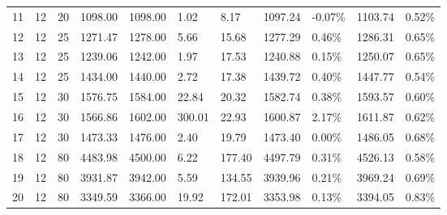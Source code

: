 \documentclass[../main]{subfiles}
\begin{document}
\begin{longtable}{l|ll|lll|lllll}
   11                  & 12                              & 20                     & 1098.00             & 1098.00  & 1.02          & 8.17                       & 1097.24                     & -0.07\% & 1103.74 & 0.52\% \\
   12                  & 12                              & 25                     & 1271.47             & 1278.00  & 5.66          & 15.68                      & \cellcolor{green!25}1277.29 & 0.46\%  & 1286.31 & 0.65\% \\
   13                  & 12                              & 25                     & 1239.06             & 1242.00  & 1.97          & 17.53                      & \cellcolor{green!25}1240.88 & 0.15\%  & 1250.07 & 0.65\% \\
   14                  & 12                              & 25                     & 1434.00             & 1440.00  & 2.72          & 17.38                      & \cellcolor{green!25}1439.72 & 0.40\%  & 1447.77 & 0.54\% \\
   15                  & 12                              & 30                     & 1576.75             & 1584.00  & 22.84         & \cellcolor{green!25}20.32  & \cellcolor{green!25}1582.74 & 0.38\%  & 1593.57 & 0.60\% \\
   16                  & 12                              & 30                     & 1566.86             & 1602.00  & 300.01        & \cellcolor{green!25}22.93  & \cellcolor{green!25}1600.87 & 2.17\%  & 1611.87 & 0.62\% \\
   17                  & 12                              & 30                     & 1473.33             & 1476.00  & 2.40          & 19.79                      & \cellcolor{green!25}1473.40 & 0.00\%  & 1486.05 & 0.68\% \\
   18                  & 12                              & 80                     & 4483.98             & 4500.00  & 6.22          & 177.40                     & \cellcolor{green!25}4497.79 & 0.31\%  & 4526.13 & 0.58\% \\
   19                  & 12                              & 80                     & 3931.87             & 3942.00  & 5.59          & 134.55                     & \cellcolor{green!25}3939.96 & 0.21\%  & 3969.24 & 0.69\% \\
   20                  & 12                              & 80                     & 3349.59             & 3366.00  & 19.92         & 172.01                     & \cellcolor{green!25}3353.98 & 0.13\%  & 3394.05 & 0.83\% \\

\end{longtable}
\end{document}
